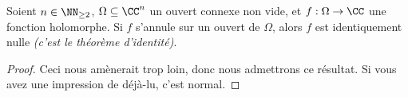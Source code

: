 \begin{fact} \label{multi-holo-nullity}
    Soient $n \in \NN_{\geq 2}$,
    $\Omega \subseteq \CC^n$ un ouvert connexe non vide,
    et
    $f: \Omega \rightarrow \CC$ une fonction holomorphe.
	Si $f$ s'annule sur un ouvert de $\Omega$,
	alors $f$ est identiquement nulle
	\emph{(c'est le théorème d'identité)}. 
\end{fact}


\begin{proof}
	Ceci nous amènerait trop loin, donc nous admettrons ce résultat. Si vous avez une impression de déjà-lu, c'est normal.
\end{proof}
